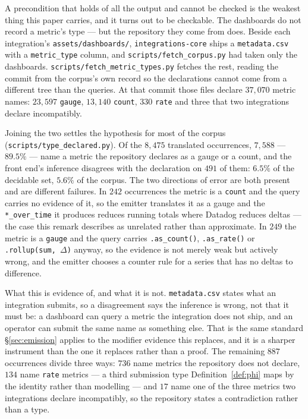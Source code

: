 \begin{remark}\label{rem:type-measured}
A precondition that holds of all the output and cannot be checked is the weakest thing
this paper carries, and it turns out to be checkable. The dashboards do not record a
metric's type --- but the repository they come from does. Beside each integration's
\texttt{assets\slash dashboards\slash}, \texttt{integrations-core} ships a
\texttt{metadata.csv} with a \texttt{metric\_type} column, and
\texttt{scripts\slash fetch\_corpus.py} had taken only the dashboards.
\texttt{scripts\slash fetch\_metric\_types.py} fetches the rest, reading the commit
from the corpus's own record so the declarations cannot come from a different tree than
the queries. At that commit those files declare $37{,}070$ metric names: $23{,}597$
\texttt{gauge}, $13{,}140$ \texttt{count}, $330$ \texttt{rate} and three that two
integrations declare incompatibly.

Joining the two settles the hypothesis for most of the corpus
(\texttt{scripts\slash type\_declared.py}). Of the $8{,}475$ translated occurrences,
$7{,}588$ --- $89.5\%$ --- name a metric the repository declares as a gauge or a count,
and the front end's inference disagrees with the declaration on $491$ of them: $6.5\%$
of the decidable set, $5.6\%$ of the corpus. The two directions of error are both
present and are different failures. In $242$ occurrences the metric is a
\texttt{count} and the query carries no evidence of it, so the emitter translates it as
a gauge and the \texttt{*\_over\_time} it produces reduces running totals where
Datadog reduces deltas --- the case this remark describes as unrelated rather than
approximate. In $249$ the metric is a \texttt{gauge} and the query carries
\texttt{.as\_count()}, \texttt{.as\_rate()} or \texttt{.rollup(sum, $\Delta$)}
anyway, so the evidence is not merely weak but actively wrong, and the emitter chooses
a counter rule for a series that has no deltas to difference.

What this is evidence of, and what it is not. \texttt{metadata.csv} states what an
integration submits, so a disagreement says the inference is wrong, not that it must
be: a dashboard can query a metric the integration does not ship, and an operator can
submit the same name as something else. That is the same standard \S\ref{sec:emission}
applies to the modifier evidence this replaces, and it is a sharper instrument than the
one it replaces rather than a proof. The remaining $887$ occurrences divide three ways: $736$ name metrics the
repository does not declare, $134$ name \texttt{rate} metrics --- a third
submission type Definition~\ref{def:phi} maps by the identity rather than modelling ---
and $17$ name one of the three metrics two integrations declare incompatibly, so the
repository states a contradiction rather than a type.
\end{remark}
